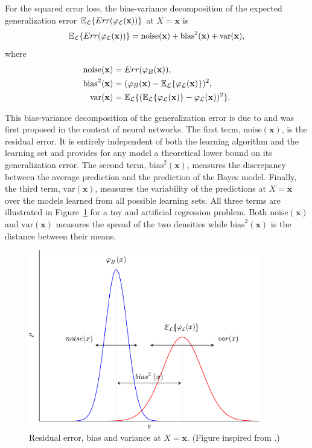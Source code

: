 \begin{theorem}\label{thm:bias-variance}
For the squared error loss, the bias-variance decomposition of the expected
generalization error $\mathbb{E}_{\cal L} \{ Err(\varphi_{\cal L}(\mathbf{x}))
\}$ at $X=\mathbf{x}$ is
\begin{equation}
\mathbb{E}_{\cal L} \{ Err(\varphi_{\cal L}(\mathbf{x})) \} = \text{noise}(\mathbf{x}) + \text{bias}^2(\mathbf{x}) + \text{var}(\mathbf{x}),
\end{equation}
where
\begin{align*}
\text{noise}(\mathbf{x}) &= Err(\varphi_B(\mathbf{x})), \\
\text{bias}^2(\mathbf{x}) &= (\varphi_B(\mathbf{x}) - \mathbb{E}_{\cal L} \{ \varphi_{\cal L}(\mathbf{x}) \} )^2, \\
\text{var}(\mathbf{x}) &= \mathbb{E}_{\cal L} \{ (\mathbb{E}_{\cal L} \{ \varphi_{\cal L}(\mathbf{x}) \} - \varphi_{\cal L}(\mathbf{x}))^2 \}.
\end{align*}
\end{theorem}

This bias-variance decomposition of the generalization error is due to
\citet{geman:1992} and was first proposed in the context of neural networks.
The first term, $\text{noise}(\mathbf{x})$, is the residual error. It is
entirely independent of both the learning algorithm and the learning set and
provides for any model a theoretical lower bound on its generalization error.
The second term, $\text{bias}^2(\mathbf{x})$, measures the discrepancy between
the average prediction and the prediction of the Bayes model. Finally, the
third term, $\text{var}(\mathbf{x})$, measures the variability of the
predictions at $X=\mathbf{x}$ over the models learned from all possible
learning sets. All three terms are illustrated in Figure~\ref{fig:bias-variance}
for a toy and artificial regression problem. Both $\text{noise}(\mathbf{x})$ and
$\text{var}(\mathbf{x})$ measures the spread of the two densities while
$\text{bias}^2(\mathbf{x})$ is the distance between their means.

\begin{figure}
    \centering
    \includegraphics[width=0.9\textwidth]{figures/ch4_bias_variance.pdf}
    \caption{Residual error, bias and variance at $X=\mathbf{x}$. (Figure inspired from \citep{geurts:2002}.)}
    \label{fig:bias-variance}
\end{figure}

